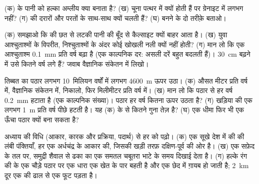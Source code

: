 \begin{exercise}[$\star\star$]\label{exo:g9:landforms:8}
(क)  के पानी को हल्का अम्लीय क्या बनाता है? (ख) चूना पत्थर में  क्यों होती हैं पर
ग्रेनाइट में लगभग नहीं? (ग)   की दरारों और परतों के साथ-साथ क्यों चलती हैं?
(घ)  बनने के दो तरीक़े बताओ।
\end{exercise}

\begin{exercise}[$\star\star$]\label{exo:g9:landforms:9}
(क) समझाओ कि  की छत से लटकी पानी की बूँद से कैल्साइट क्यों बाहर आता है। (ख) युवा
आश्चुताश्मों के विपरीत, निश्चुताश्मों के अंदर कोई खोखली नली क्यों नहीं होती? (ग) मान लो कि
एक आश्चुताश्म \qty{0.1}{mm} प्रति वर्ष बढ़ा है (एक काल्पनिक दर: असली दरें बहुत बदलती
हैं)। \qty{30}{cm} बढ़ने में उसे कितने वर्ष लगे हैं? जवाब वैज्ञानिक संकेतन में
लिखो।
\end{exercise}

\begin{exercise}[$\star\star$]\label{exo:g9:landforms:10}
तिब्बत का पठार लगभग 10~मिलियन वर्षों में लगभग \qty{4600}{m} ऊपर उठा।
(क) औसत  मीटर प्रति वर्ष में, वैज्ञानिक संकेतन में, निकालो, फिर मिलीमीटर प्रति वर्ष
में। (ख) मान लो कि  पठार से हर वर्ष \qty{0.2}{mm} हटाता है (एक काल्पनिक संख्या)।
पठार हर वर्ष कितना ऊपर उठता है? (ग) खड़िया की एक  लगभग \qty{1}{m} प्रति वर्ष पीछे
हटती है। यह (क) के  से कितने गुना तेज़ है? (घ) एक धीमा  फिर भी एक ऊँचा पठार
क्यों बना सकता
है?
\end{exercise}

\begin{exercise}[$\star\star\star$]\label{exo:g9:landforms:11}
अध्याय की विधि (आकार, कारक और प्रक्रिया, पदार्थ) से हर  को पढ़ो। (क) एक सूखे देश
में  की  की लंबी पंक्तियाँ, हर एक अर्धचंद्र के आकार की, जिसकी खड़ी तरफ़
दक्षिण-पूर्व की ओर है। (ख) एक सफ़ेद  के तल पर, समुद्री शैवाल से ढका  का एक समतल
चबूतरा भाटे के समय दिखाई देता है। (ग) हल्के रंग की  के एक चौड़े पठार पर एक धारा
एक खेत के पार बहती है और एक छेद में ग़ायब हो जाती है; \qty{2}{km} दूर एक  की
ढाल से एक  फूट पड़ता है।
\end{exercise}


